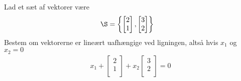 \begin{eks}\label{lineu}
Lad et sæt af vektorer være
\begin{align*}
\S &= \left\{
\begin{bmatrix}
           2 \\
           1 \\
\end{bmatrix}
,
\begin{bmatrix}
           3 \\
           2 \\
\end{bmatrix}
\right\}
\end{align*}
\noindent
Bestem om vektorerne er lineært uafhængige ved ligningen, altså hvis $x_1$ og $x_2 = 0$
\begin{align*}
x_1+
\begin{bmatrix}
           2 \\
           1 \\
\end{bmatrix}
+ x_2
\begin{bmatrix}
           3 \\
           2 \\
\end{bmatrix}
=0 \\
\end{align*}


\end{eks}
